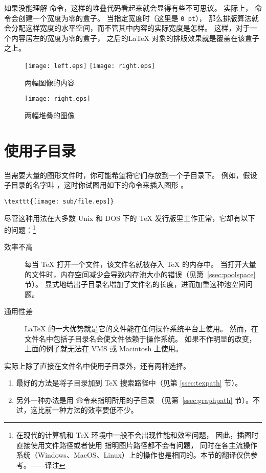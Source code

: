 如果没能理解  命令，这样的堆叠代码看起来就会显得有些不可思议。
实际上， 命令会创建一个宽度为零的盒子。
当指定宽度时（这里是 \texttt{0 pt}），
那么排版算法就会分配这样宽度的水平空间，而不管其中内容的实际宽度是怎样。
这样，对于一个内容居左的宽度为零的盒子，
之后的\LaTeX{} 对象的排版效果就是覆盖在该盒子之上。

\begin{figure}
	\centering
	\texttt{[image: left.eps]}
	\texttt{[image: right.eps]}
	\caption{两幅图像的内容}\label{fig:leftright}
\end{figure}
\begin{figure}
	\centering
	\texttt{[image: right.eps]}
	\caption{两幅堆叠的图像}\label{fig:leftrightoverlay}
\end{figure}

\section{使用子目录}\label{sec:subdir}

当需要大量的图形文件时，你可能希望将它们存放到一个子目录下。
例如，假设子目录的名字叫 ，这时你试图用如下的命令来插入图形 。
\begin{lstlisting}
\texttt{[image: sub/file.eps]}
\end{lstlisting}

尽管这种用法在大多数 Unix 和 DOS 下的 \TeX{} 发行版里工作正常，它却有以下的问题：\footnote{
在现代的计算机和 \TeX{} 环境中一般不会出现性能和效率问题，
因此，插图时直接使用文件路径或者使用   指明图片路径都不会有问题，
同时在各主流操作系统（Windows、MacOS、Linux）上的操作也是相同的。本节的翻译仅供参考。——译注}
\begin{description}
	\item [效率不高]
	
	每当 \TeX{} 打开一个文件，该文件名就被存入 \TeX{} 的内存中。
	当打开大量的文件时，内存空间减少会导致内存池大小的错误（见第~\ref{ssec:poolspace} 节）。
	显式地给出子目录名增加了文件名的长度，进而加重这种池空间问题。
	
	\item [通用性差]
	
	\LaTeX{} 的一大优势就是它的文件能在任何操作系统平台上使用。
	然而，在文件名中包括子目录名会使文件依赖于操作系统。
	如果不作明显的改变，上面的例子就无法在 VMS 或 Macintosh 上使用。
\end{description}
实际上除了直接在文件名中使用子目录外，还有两种选择。
\begin{enumerate}
	\item 最好的方法是将子目录加到 \TeX{} 搜索路径中（见第 \ref{ssec:texpath} 节）。
	\item 另外一种办法是用  命令来指明所用的子目录
	（见第~\ref{ssec:graphpath} 节）。不过，这比前一种方法的效率要低不少。
\end{enumerate}

